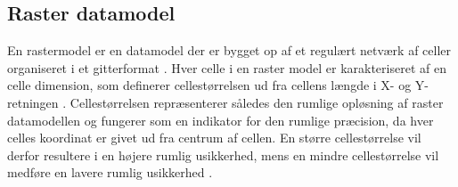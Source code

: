 \subsection{Raster datamodel} \label{Afsnit: Raster data model}

En rastermodel er en datamodel der er bygget op af et regulært netværk af celler organiseret i et gitterformat \citep{bolstad_gis_2022, esri_raster}. Hver celle i en raster model er karakteriseret af en celle dimension, som definerer cellestørrelsen ud fra cellens længde i X- og Y-retningen \citep{bolstad_gis_2022, silbernagel_raster_2018}. Cellestørrelsen repræsenterer således den rumlige opløsning af raster datamodellen og fungerer som en indikator for den rumlige præcision, da hver celles koordinat er givet ud fra centrum af cellen. En større cellestørrelse vil derfor resultere i en højere rumlig usikkerhed, mens en mindre cellestørrelse vil medføre en lavere rumlig usikkerhed \citep{bolstad_gis_2022}. \\

